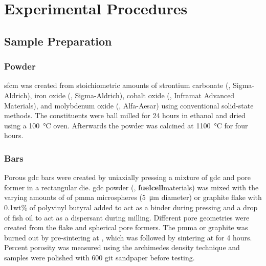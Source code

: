 


\chapter{Experimental Procedures}

\section{Sample Preparation}

    \subsection{ Powder}
        \gls{sfcm} was created from stoichiometric amounts of strontium carbonate (, Sigma-Aldrich), iron oxide (, Sigma-Aldrich), cobalt oxide (, Inframat Advanced Materials), and molybdenum oxide (, Alfa-Aesar) using conventional solid-state methods.
        The constituents were ball milled for 24 hours in ethanol and dried using a \SI{100}{\celsius} oven.
        Afterwards the powder was calcined at \SI{1100}{\celsius} for four hours.

    \subsection{Bars}
        Porous \gls{gdc} bars were created by uniaxially pressing a mixture of \gls{gdc} and pore former in a rectangular die.
        \Gls{gdc} powder (, \textbf{fuelcell}materials) was mixed with the varying amounts of of \gls{pmma} microspheres (\SI{5}{\micro\meter} diameter) or graphite flake with 0.1wt\% of polyvinyl butyral added to act as a binder during pressing and a drop of fish oil to act as a dispersant during milling.
        Different pore geometries were created from the flake and spherical pore formers.
        The \gls{pmma} or graphite was burned out by pre-sintering at , which was followed by sintering at  for 4 hours.
        Percent porosity was measured using the archimedes density technique and samples were polished with 600 git sandpaper before testing.

